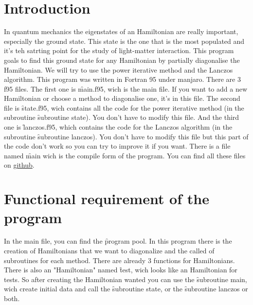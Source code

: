 \documentclass[1pt, a4paper]{article}
\begin{document}
\maketitlepage
\tableofcontents
\newpage
\section{Introduction}
\label{sec:intro}
\noindent
In quantum mechanics the eigenstates of an Hamiltonian are really important, especially the ground state. This state is the one that is the most populated and it's teh satrting point for the study of light-matter interaction. This program goals to find this ground state for any Hamiltonian by partially diagonalise the Hamiltonian. We will try to use the power iterative method and the Lanczos algorithm. This program was written in Fortran 95 under manjaro. There are 3 f95 files. The first one is \f{main.f95}, wich is the main file. If you want to add a new Hamiltonian or choose a method to diagonalise one, it's in this file. The second file is  \f{state.f95}, wich contains all the code for the power iterative method (in the subroutine \f{subroutine state}). You don't have to modify this file. And the third one is \f{lanczos.f95}, which contains the code for the Lanczos algorithm (in the subroutine \f{subroutine lanczos}). You don't have to modify this file but this part of the code don't work so you can try to improve it if you want. There is a file named \f{main} wich is the compile form of the program. You can find all these files on \href{https://github.com/faucheresse/fortran-swimming-pool.git}{github}.
\section{Functional requirement of the program}
\label{sec:2}
\noindent
In the main file, you can find the \f{program pool}. In this program there is the creation of Hamiltonians that we want to diagonalize and the called of subroutines for each method. There are already 3 functions for Hamiltonians. There is also an "Hamiltonian" named \f{test}, wich looks like an Hamiltonian for tests. So after creating the Hamiltonian wanted you can use the \f{subroutine main}, wich create initial data and call the \f{subroutine state}, or the \f{subroutine lanczos} or both.
\end{document}

